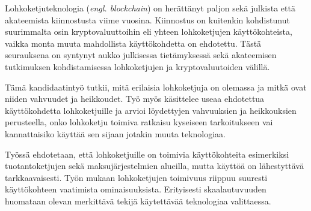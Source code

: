 %
%

\begin{fiabstract}
Lohkoketjuteknologia (\textit{engl. blockchain}) on herättänyt paljon sekä
julkista että akateemista kiinnostusta viime vuosina. Kiinnostus on
kuitenkin kohdistunut suurimmalta osin kryptovaluuttoihin eli yhteen
lohkoketjujen käyttökohteista, vaikka monta muuta mahdollista
käyttökohdetta on ehdotettu. Tästä seurauksena on syntynyt aukko
julkisessa tietämyksessä sekä akateemisen tutkimuksen kohdistamisessa
lohkoketjujen ja kryptovaluutoiden välillä.

Tämä kandidaatintyö tutkii, mitä erilaisia lohkoketjuja on olemassa ja
mitkä ovat niiden vahvuudet ja heikkoudet. Työ myös käsittelee useaa
ehdotettua käyttökohdetta lohkoketjuille ja arvioi löydettyjen
vahvuuksien ja heikkouksien perusteella, onko lohkoketju toimiva
ratkaisu kyseiseen tarkoitukseen vai kannattaisiko käyttää sen sijaan
jotakin muuta teknologiaa.

Työssä ehdotetaan, että lohkoketjuille on toimivia käyttökohteita
esimerkiksi tuotantoketjujen sekä maksujärjestelmien alueilla, mutta
käyttöä on lähestyttävä tarkkaavaisesti. Työn mukaan lohkoketjujen
toimivuus riippuu suuresti käyttökohteen vaatimista ominaisuuksista.
Erityisesti skaalautuvuuden huomataan olevan merkittävä tekijä
käytettävää teknologiaa valittaessa.

%
\end{fiabstract}


